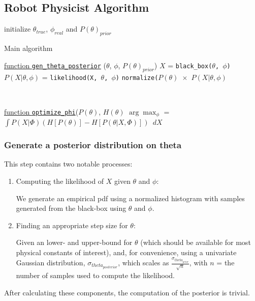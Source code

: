 \documentclass[10pt,journal,compsoc]{IEEEtran}
\begin{document}
\subsection{Robot Physicist Algorithm}
\begin{algorithm}
 initialize $\theta_{true}$, $\phi_{real}$ and $P(\theta)_{prior}$\;
\caption{Main algorithm}


    \underline{function \texttt{gen\_theta\_posterior}} ($\theta$, $\phi$, $P(\theta)_{prior}$)\;
    $X$ = \texttt{black\_box($\theta$, $\phi$)}\;
    $P(X | \theta, \phi) $ = \texttt{likelihood(X, $\theta$, $\phi$)}\;
    \Return \texttt{normalize($P(\theta)$ $\times$ $P(X | \theta, \phi) $}\;

\

	\underline{function \texttt{optimize\_phi}}($P(\theta)$, $H(\theta)$\;
    \Return $\arg\max_\phi$ = $\int P(X|\Phi) (H[P(\theta)]-H[P(\theta|X,\Phi)])$ $\, dX$
\end{algorithm}

\subsubsection{Generate a posterior distribution on theta}
This step contains two notable processes:
\begin{enumerate}
\item Computing the likelihood of $X$ given $\theta$ and $\phi$:

We generate an empirical pdf using a normalized histogram with samples generated from the black-box using $\theta$ and $\phi$.
\item Finding an appropriate step size for $\theta $:

Given an lower- and upper-bound for $\theta$ (which should be available for most physical constants of interest), and, for convenience, using a univariate Gaussian distribution, $\sigma_{theta_{posterior}}$, which scales as $\frac{\sigma_{theta_{prior}}}{\sqrt{n}}$, with $n$ = the number of samples used to compute the likelihood.
\end{enumerate}
After calculating these components, the computation of the posterior is trivial.
\end{document}
